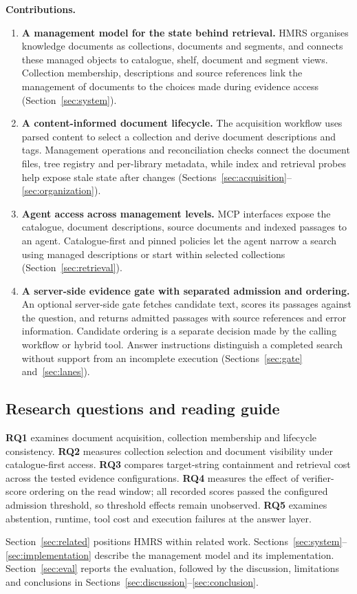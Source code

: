 \noindent\textbf{Contributions.}
\begin{enumerate}
\item \textbf{A management model for the state behind retrieval.} HMRS
organises knowledge documents as collections, documents and segments, and
connects these managed objects to catalogue, shelf, document and segment
views. Collection membership, descriptions and source references link the
management of documents to the choices made during evidence access
(Section~\ref{sec:system}).
\item \textbf{A content-informed document lifecycle.} The acquisition
workflow uses parsed content to select a collection and derive document
descriptions and tags. Management operations and reconciliation checks
connect the document files, tree registry and per-library metadata, while
index and retrieval probes help expose stale state after changes
(Sections~\ref{sec:acquisition}--\ref{sec:organization}).
\item \textbf{Agent access across management levels.} MCP interfaces expose
the catalogue, document descriptions, source documents and indexed passages
to an agent. Catalogue-first and pinned policies let the agent narrow a
search using managed descriptions or start within selected collections
(Section~\ref{sec:retrieval}).
\item \textbf{A server-side evidence gate with separated admission and
ordering.} An optional server-side
gate fetches candidate text, scores its passages against the question, and
returns admitted passages with source references and error information.
Candidate ordering is a separate decision made by the calling workflow or
hybrid tool. Answer instructions distinguish a completed search without
support from an incomplete execution
(Sections~\ref{sec:gate} and~\ref{sec:lanes}).
\end{enumerate}

\subsection{Research questions and reading guide}
\label{sec:rq}

\textbf{RQ1} examines document acquisition, collection membership and
lifecycle consistency. \textbf{RQ2} measures collection selection and
document visibility under catalogue-first access. \textbf{RQ3} compares
target-string containment and retrieval cost across the tested evidence
configurations. \textbf{RQ4} measures the effect of verifier-score ordering
on the read window; all recorded scores passed the configured admission
threshold, so threshold effects remain unobserved.
\textbf{RQ5} examines abstention, runtime, tool cost and execution failures
at the answer layer.

Section~\ref{sec:related} positions HMRS within related work.
Sections~\ref{sec:system}--\ref{sec:implementation} describe the management
model and its implementation. Section~\ref{sec:eval} reports the evaluation,
followed by the discussion, limitations and conclusions in
Sections~\ref{sec:discussion}--\ref{sec:conclusion}.
